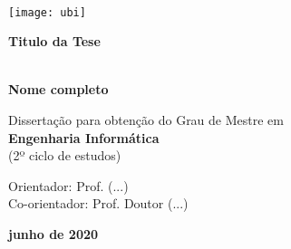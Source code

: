 \begin{titlepage}
\begin{center}

\rostosubtit \textbf{}\\


\begin{flushright}
 \texttt{[image: ubi]}\\
\end{flushright}

\begin{flushright}
\vspace{6.0cm}

\rostotitulo \textbf{Titulo da Tese} \\
\rostosubtit \textbf{}\\

\vspace{1.8cm}

\rostonomes \textbf{Nome completo}\\

\vspace{1.4cm}

\rostooutros Dissertação para obtenção do Grau de Mestre em\\
\rostonomes \textbf{Engenharia Informática}\\
\rostooutros (2º ciclo de estudos)\\

\vspace{3.3cm}

\rostooutros Orientador: Prof. (...)\\
Co-orientador: Prof. Doutor (...)\\

\vspace{1.4cm}

\rostooutros \textbf{junho de 2020}

\end{flushright}

\end{center}
\end{titlepage}

